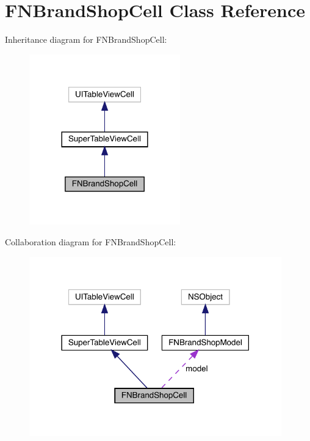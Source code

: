 \hypertarget{interface_f_n_brand_shop_cell}{}\section{F\+N\+Brand\+Shop\+Cell Class Reference}
\label{interface_f_n_brand_shop_cell}


Inheritance diagram for F\+N\+Brand\+Shop\+Cell\+:\nopagebreak
\begin{figure}[H]
\begin{center}
\leavevmode
\includegraphics[width=185pt]{interface_f_n_brand_shop_cell__inherit__graph}
\end{center}
\end{figure}


Collaboration diagram for F\+N\+Brand\+Shop\+Cell\+:\nopagebreak
\begin{figure}[H]
\begin{center}
\leavevmode
\includegraphics[width=310pt]{interface_f_n_brand_shop_cell__coll__graph}
\end{center}
\end{figure}
